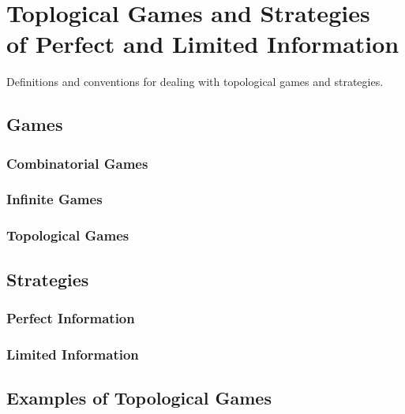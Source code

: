 
\chapter{Toplogical Games and Strategies\\ of Perfect and Limited Information}

Definitions and conventions for dealing with topological games and strategies.

\section{Games}

\subsection{Combinatorial Games}

\subsection{Infinite Games}

\subsection{Topological Games}


\section{Strategies}

\subsection{Perfect Information}

\subsection{Limited Information}


\section{Examples of Topological Games}
